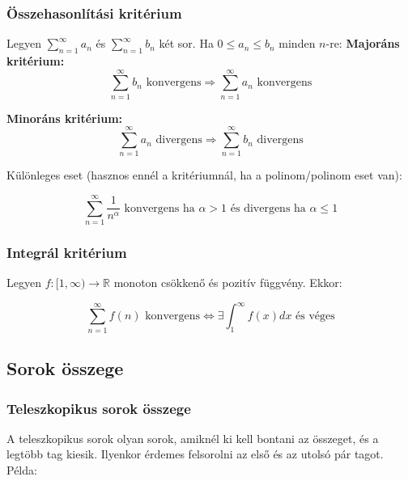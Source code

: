 \documentclass{article}
\begin{document}
\subsubsection{Összehasonlítási kritérium}

Legyen $\sum_{n=1}^{\infty} a_n$ és $\sum_{n=1}^{\infty} b_n$ két sor. Ha $0 \leq a_n \leq b_n$ minden $n$-re:
\vspace{4mm}
\newline
\textbf{Majoráns kritérium:}
\begin{equation*}
    \sum_{n=1}^{\infty} b_n \text{ konvergens} \Rightarrow \sum_{n=1}^{\infty} a_n \text{ konvergens}
\end{equation*}

\textbf{Minoráns kritérium:}
\begin{equation*}
    \sum_{n=1}^{\infty} a_n \text{ divergens} \Rightarrow \sum_{n=1}^{\infty} b_n \text{ divergens}
\end{equation*}

Különleges eset (hasznos ennél a kritériumnál, ha a polinom/polinom eset van):

\begin{equation*}
   \sum_{n=1}^{\infty} \frac{1}{n^{\alpha}} \text{ konvergens ha } \alpha > 1 \text{ és divergens ha } \alpha \leq 1
\end{equation*}

\subsubsection{Integrál kritérium}

Legyen $f: [1, \infty) \rightarrow \mathbb{R}$ monoton csökkenő és pozitív függvény. Ekkor:

\begin{equation*}
    \sum_{n=1}^{\infty} f(n) \text{ konvergens} \Leftrightarrow \exists \int_{1}^{\infty} f(x) dx \text{ és véges}
\end{equation*}

\newpage

\subsection{Sorok összege}

\subsubsection{Teleszkopikus sorok összege}

A teleszkopikus sorok olyan sorok, amiknél ki kell bontani az összeget, és a legtöbb tag kiesik. Ilyenkor érdemes felsorolni az első és az utolsó pár tagot. Példa:
\end{document}
